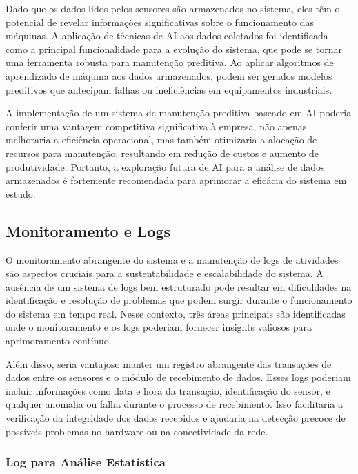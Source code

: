 Dado que os dados lidos pelos sensores são armazenados no sistema, eles têm o potencial de revelar informações significativas sobre o funcionamento das máquinas. A aplicação de técnicas de \gls{AI} aos dados coletados foi identificada como a principal funcionalidade para a evolução do sistema, que pode se tornar uma ferramenta robusta para manutenção preditiva. Ao aplicar algoritmos de aprendizado de máquina aos dados armazenados, podem ser gerados modelos preditivos que antecipam falhas ou ineficiências em equipamentos industriais.

A implementação de um sistema de manutenção preditiva baseado em \gls{AI} poderia conferir uma vantagem competitiva significativa à empresa, não apenas melhoraria a eficiência operacional, mas também otimizaria a alocação de recursos para manutenção, resultando em redução de custos e aumento de produtividade. Portanto, a exploração futura de \gls{AI} para a análise de dados armazenados é fortemente recomendada para aprimorar a eficácia do sistema em estudo.

\subsection{Monitoramento e Logs}

O monitoramento abrangente do sistema e a manutenção de logs de atividades são aspectos cruciais para a sustentabilidade e escalabilidade do sistema. A ausência de um sistema de logs bem estruturado pode resultar em dificuldades na identificação e resolução de problemas que podem surgir durante o funcionamento do sistema em tempo real. Nesse contexto, três áreas principais são identificadas onde o monitoramento e os logs poderiam fornecer insights valiosos para aprimoramento contínuo.

Além disso, seria vantajoso manter um registro abrangente das transações de dados entre os sensores e o módulo de recebimento de dados. Esses logs poderiam incluir informações como data e hora da transação, identificação do sensor, e qualquer anomalia ou falha durante o processo de recebimento. Isso facilitaria a verificação da integridade dos dados recebidos e ajudaria na detecção precoce de possíveis problemas no hardware ou na conectividade da rede.

\subsubsection{Log para Análise Estatística}\label{subsubsec:futurelogs}

